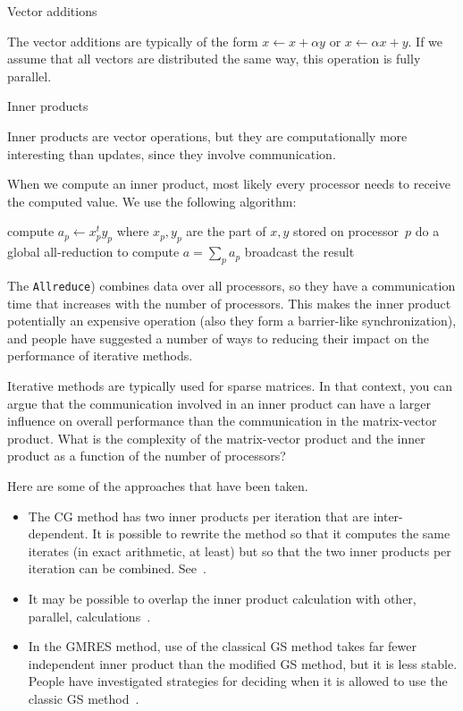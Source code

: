 {Vector additions}

The vector additions are
typically of the form $x\leftarrow x+\alpha y$ or $x\leftarrow \alpha x+y$.
If we assume that all vectors are distributed the same way, this
operation is fully parallel.

 {Inner products}
\label{sec:iter-inprod}

Inner products are vector operations, but they are computationally
more interesting than updates, since they involve communication. 

When we compute an inner product, most likely 
every processor needs to receive the computed value. We
use the following algorithm:

\begin{displayalgorithm}
   {
    compute $a_p\leftarrow x_p^ty_p$ where $x_p,y_p$ are the part of
    $x,y$ stored on processor~$p$ }
    do a global all-reduction to compute $a=\sum_p a_p$ \;
    broadcast the result
  \caption{Compute $a\leftarrow x^ty$ where $x,y$ are distributed vectors.}
\end{displayalgorithm}

The {\tt Allreduce}) combines data over all processors, so they have a
communication time that increases with the number of processors. This
makes the inner product potentially an expensive operation
(also they form a barrier-like synchronization), and people
have suggested a number of ways to reducing their impact on the
performance of iterative methods.

\begin{exercise}
  Iterative methods are typically used for sparse matrices. In that
  context, you can argue that the communication involved in an inner product
  can have a larger influence on overall performance than the
  communication in the matrix-vector product. What is the
  complexity of the matrix-vector product and the inner product as a
  function of the number of processors?
\end{exercise}

Here are some of the approaches that have been taken.
\begin{itemize}
\item The \ac{CG} method has two inner products per iteration that are
  inter-dependent. It is possible to rewrite the method so that it
  computes the same iterates (in exact arithmetic, at least) but so
  that the two inner products per iteration can be
  combined. See~\cite{ChGe:sstep,DAzEijRo:ppscicomp,Me:multicg,YandBrent:bicgstab}.
\item It may be possible to overlap the inner product calculation with
  other, parallel, calculations~\cite{dehevo92:acta}.
\item In the \ac{GMRES} method, use of the classical \acf{GS}
  method takes far fewer independent inner product than the modified
  \ac{GS} method, but it is less stable. People have investigated strategies for deciding
  when it is allowed to use the classic \ac{GS} method~\cite{Langou:thesis}.
\end{itemize}

